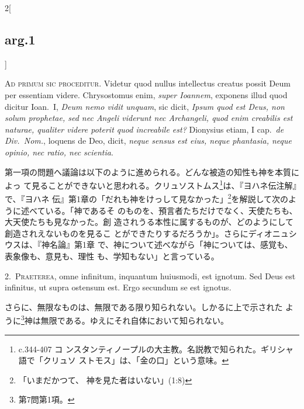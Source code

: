 \documentclass[paper=a4paper,fontsize=10pt,jafontsize=9pt,titlepage]{jlreq}
\begin{document}
{}
\setcounter{section}{1}
\setcounter{subsection}{0}

\begin{paracol}{2}[\subsection{arg.1}]

{\huge A}{\scshape d primum sic proceditur}. Videtur quod nullus
intellectus creatus possit Deum per essentiam videre. Chrysostomus
enim, {\itshape super Ioannem}, exponens illud quod dicitur Ioan.\ I, {\itshape
Deum nemo vidit unquam}, sic dicit, {\itshape Ipsum quod est Deus, non
solum prophetae, sed nec Angeli viderunt nec Archangeli, quod enim
creabilis est naturae, qualiter videre poterit quod increabile est?}
Dionysius etiam, I cap.\ {\itshape de Div.\ Nom.}, loquens de Deo, dicit,
{\itshape neque sensus est eius, neque phantasia, neque opinio, nec ratio,
nec scientia}.

\switchcolumn

第一項の問題へ議論は以下のように進められる。どんな被造の知性も神を本質によっ
て見ることができないと思われる。クリュソストムス\footnote{c.344-407 コ
ンスタンティノープルの大主教。名説教で知られた。ギリシャ語で「クリュソ
ストモス」は、「金の口」という意味。}は、『ヨハネ伝注解』で、『ヨハネ
伝』第1章の「だれも神をけっして見なかった」\footnote{「いまだかつて、
神を見た者はいない」(1:8)}を解説して次のように述べている。「神であるそ
のものを、預言者たちだけでなく、天使たちも、大天使たちも見なかった。創
造されうる本性に属するものが、どのようにして創造されえないものを見るこ
とができたりするだろうか」。さらにディオニュシウスは、『神名論』第1章
で、神について述べながら「神については、感覚も、表象像も、意見も、理性
も、学知もない」と言っている。


2.~{\scshape Praeterea}, omne infinitum, inquantum huiusmodi, est ignotum. Sed Deus
 est infinitus, ut supra ostensum est. Ergo secundum se est ignotus.

\switchcolumn

さらに、無限なものは、無限である限り知られない。しかるに上で示された
ように\footnote{第7問第1項。}神は無限である。ゆえにそれ自体において知られない。


\end{paracol}
\end{document}
